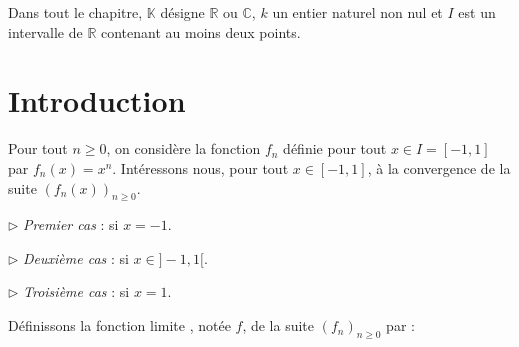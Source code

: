 \documentclass[a4paper,10pt]{report}
\begin{document}



Dans tout le chapitre, $\mathbb{K}$ désigne $\mathbb{R}$ ou $\mathbb{C}$, $k$ un entier naturel non nul et $I$ est un intervalle de $\mathbb{R}$ contenant au moins deux points.

\medskip

\section{Introduction} 

Pour tout $n \geq 0$, on considère la fonction $f_n$ définie pour tout $x \in I= [-1,1]$ par $f_n(x)=x^n$. Intéressons nous, pour tout $x \in [-1,1]$, à la convergence de la suite $(f_n(x))_{n \geq 0}$.

\medskip

$\rhd$ \emph{Premier cas} : si $x=-1$.

%

\vspace{2.5cm}
$\rhd$ \emph{Deuxième cas} : si $x \in ]-1,1[$.
%

\vspace{2.5cm}


$\rhd$ \emph{Troisième cas} : si $x=1$.
%
%
\vspace{2.5cm}

Définissons la fonction \og limite \fg, notée $f$, de la suite $(f_n)_{n \geq 0}$ par :

\vspace{2.5cm}
\end{document}
